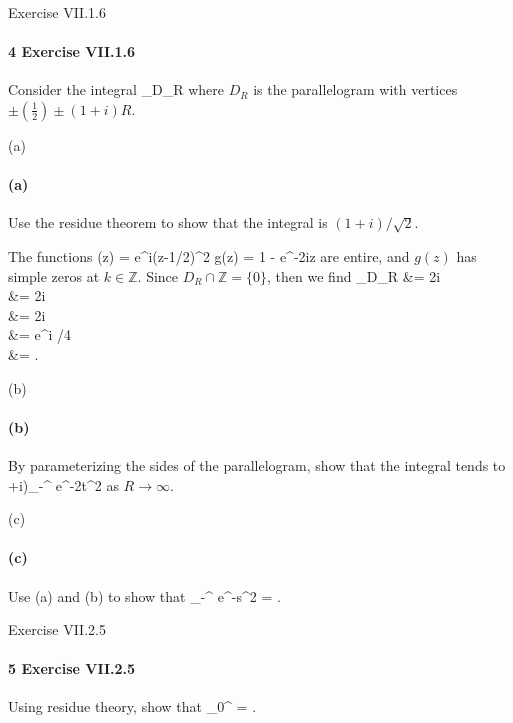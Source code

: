 \documentclass[12pt]{article}
\newenvironment{fullbox}{\begin{lrbox}{\savefullbox}\begin{minipage}{\dimexpr\textwidth-2\fboxsep\relax}}{\end{minipage}\end{lrbox}\begin{center}\framebox[\textwidth]{\usebox{\savefullbox}}\end{center}}
\newenvironment{pbox}[1][]{\begin{fullbox}\ifx#1\empty\else\paragraph{#1}\fi}{\end{fullbox}}
\theoremstyle{definition}
\newcommand{\isp}[1]{\quad\text{#1}\quad}
\newcommand{\Z}{\mathbb{Z}}
\newcommand{\bd}{\partial}
\def\[#1\]{\begin{align*}#1\end{align*}}
\begin{document}
\newpage
\begin{pbox}[4 Exercise VII.1.6]
    Consider the integral
    \[
        \int_{\bd D_R}  
    \]
    where $D_R$ is the parallelogram with vertices $\pm(\frac12) \pm (1 + i)R$.
\end{pbox}

\begin{pbox}[(a)]
    Use the residue theorem to show that the integral is $(1 + i)/\sqrt{2}$.
\end{pbox}

The functions
\[
    f(z) = e^{\pi i(z-1/2)^2} \isp{and} g(z) = 1 - e^{-2\pi iz}
\]
are entire, and $g(z)$ has simple zeros at $k \in \Z$. Since $D_R \cap \Z = \{0\}$, then we find
\[
    \int_{\bd D_R}  
        &= 2\pi i \Res[\frac{f(z)}{g(z)}, 0] \\
        &= 2\pi i \cdot {} \\
        &= 2\pi i \cdot {} \\
        &= e^{i \pi/4} \\
        &= .
\]

\begin{pbox}[(b)]
    By parameterizing the sides of the parallelogram, show that the integral tends to
    \[
        (1+i)\int_{-\infty}^{\infty} e^{-2\pi t^2} 
    \]
    as $R \to \infty$.
\end{pbox}

\begin{pbox}[(c)]
    Use (a) and (b) to show that
    \[
        \int_{-\infty}^{\infty} e^{-s^2}  = \sqrt{\pi}.
    \]
\end{pbox}


\newpage
\begin{pbox}[5 Exercise VII.2.5]
    Using residue theory, show that
    \[
        \int_{0}^{\infty}   = .
    \]
\end{pbox}
\end{document}
